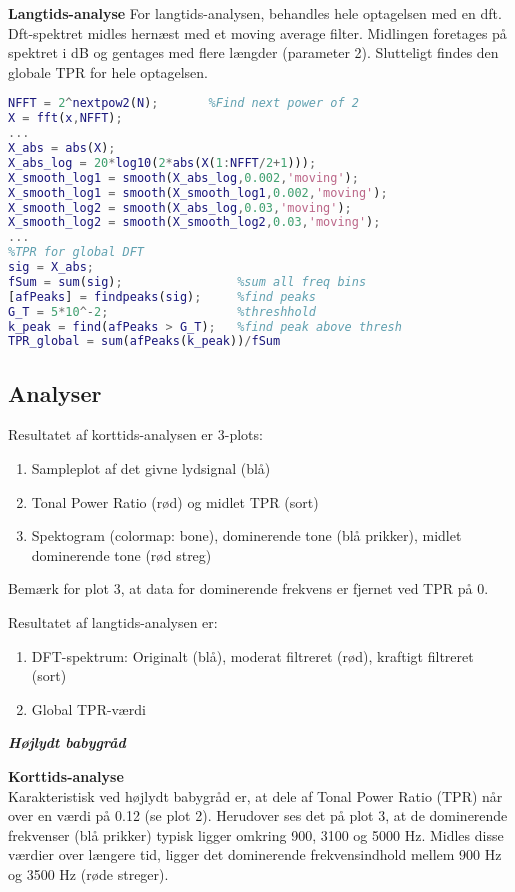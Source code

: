 \textbf{Langtids-analyse}
For langtids-analysen, behandles hele optagelsen med en dft. Dft-spektret midles hernæst med et moving average filter. Midlingen foretages på spektret i dB og gentages med flere længder (parameter 2). Slutteligt findes den globale TPR for hele optagelsen. 

\begin{lstlisting}[language=Matlab]
%**** FAST FOURIER TRANSFORM *********************************** 
NFFT = 2^nextpow2(N);       %Find next power of 2
X = fft(x,NFFT);
...
X_abs = abs(X);
X_abs_log = 20*log10(2*abs(X(1:NFFT/2+1)));
X_smooth_log1 = smooth(X_abs_log,0.002,'moving');
X_smooth_log1 = smooth(X_smooth_log1,0.002,'moving'); 
X_smooth_log2 = smooth(X_abs_log,0.03,'moving');       
X_smooth_log2 = smooth(X_smooth_log2,0.03,'moving');
...
%TPR for global DFT
sig = X_abs;
fSum = sum(sig);                %sum all freq bins
[afPeaks] = findpeaks(sig);     %find peaks
G_T = 5*10^-2;                  %threshhold
k_peak = find(afPeaks > G_T);   %find peak above thresh
TPR_global = sum(afPeaks(k_peak))/fSum 
\end{lstlisting}

\newpage
\subsection*{Analyser}
Resultatet af korttids-analysen er 3-plots:
\begin{enumerate}
	\item Sampleplot af det givne lydsignal (blå)
	\item Tonal Power Ratio (rød) og midlet TPR (sort)
	\item Spektogram (colormap: bone), dominerende tone (blå prikker), midlet dominerende tone (rød streg)
\end{enumerate}
Bemærk for plot 3, at data for dominerende frekvens er fjernet ved TPR på 0.

Resultatet af langtids-analysen er:
\begin{enumerate}
	\item DFT-spektrum: Originalt (blå), moderat filtreret (rød), kraftigt filtreret (sort)
	\item Global TPR-værdi
\end{enumerate}

\newpage
\begin{center}  \textit{\textbf{Højlydt babygråd}}  \end{center}
\textbf{Korttids-analyse} \\
Karakteristisk ved højlydt babygråd er, at dele af Tonal Power Ratio (TPR) når over en værdi på 0.12 (se plot 2). Herudover ses det på plot 3, at de dominerende frekvenser (blå prikker) typisk ligger omkring 900, 3100 og 5000 Hz. Midles disse værdier over længere tid, ligger det dominerende frekvensindhold mellem 900 Hz og 3500 Hz (røde streger). 


